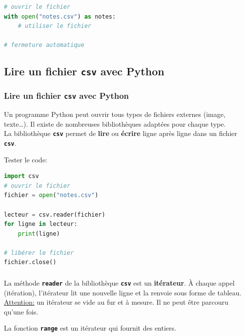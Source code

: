 \documentclass[svgnames,11pt]{beamer}
\begin{document}
\begin{frame}[fragile]
    \frametitle{}
    \begin{center}
        \begin{lstlisting}[language=Python , basicstyle=\ttfamily\small, xleftmargin=2em, xrightmargin=2em]
# ouvrir le fichier
with open("notes.csv") as notes:
    # utiliser le fichier

# fermeture automatique
\end{lstlisting}
        \label{ouvrir}
    \end{center}

\end{frame}
\subsection{Lire un fichier \textbf{\texttt{csv}} avec Python}
\begin{frame}
    \frametitle{Lire un fichier \textbf{\texttt{csv}} avec Python}
    \begin{aretenir}[]
        Un programme Python peut ouvrir tous types de fichiers externes (image, texte\dots). Il existe de nombreuses bibliothèques adaptées pour chaque type.\\La bibliothèque \textbf{\texttt{csv}} permet de \textbf{lire} ou \textbf{écrire} ligne après ligne dans un fichier \textbf{\texttt{csv}}.
    \end{aretenir}

\end{frame}
\begin{frame}[fragile]


    \begin{activite}
        Tester le code:
        \begin{center}
            \begin{lstlisting}[language=Python , basicstyle=\ttfamily\small, xleftmargin=2em, xrightmargin=2em]
import csv
# ouvrir le fichier
fichier = open("notes.csv")

lecteur = csv.reader(fichier)
for ligne in lecteur:
    print(ligne)

# libérer le fichier
fichier.close()
\end{lstlisting}
        \end{center}
    \end{activite}
\end{frame}
\begin{frame}
    \frametitle{}

    \begin{aretenir}[]
        La méthode \textbf{\texttt{reader}} de la bibliothèque \textbf{\texttt{csv}} est un \textbf{itérateur}. À chaque appel (itération), l'itérateur lit une nouvelle ligne et la renvoie sous forme de tableau.\\
        \underline{Attention:} un itérateur se vide au fur et à mesure. Il ne peut être parcouru qu'une fois.
    \end{aretenir}
    \begin{aretenir}[Remarque]
        La fonction \textbf{\texttt{range}} est un itérateur qui fournit des entiers.
    \end{aretenir}
\end{frame}
\end{document}

